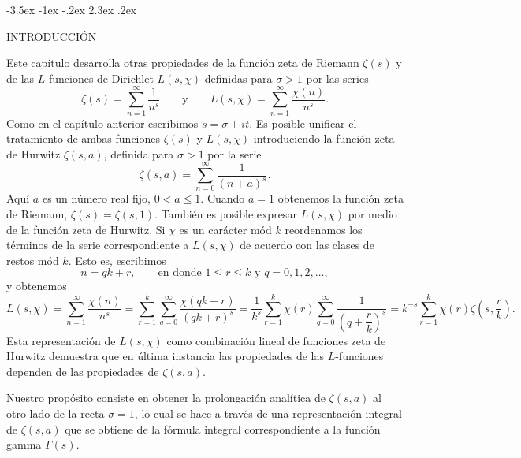 \documentclass[12pt,a4paper]{book}
\makeatletter
\renewcommand\section{\@startsection{section}{1}{\z@}%
  {-3.5ex \@plus -1ex \@minus -.2ex}%
  {2.3ex \@plus .2ex}%
  {\normalfont\Large\bfseries\raggedright}}
\makeatother
\begin{document}
    \section{INTRODUCCIÓN}

    Este capítulo desarrolla otras propiedades de la función zeta de Riemann $\zeta(s)$ y de\label{sim:zeta}\label{sim:zsa}
    las $L$-funciones de Dirichlet $L(s,\chi)$ definidas para $\sigma>1$ por las series
    \begin{equation*}
        \zeta(s)=\sum_{n=1}^{\infty}\frac{1}{n^{s}}\qquad\text{y}\qquad L(s,\chi)=\sum_{n=1}^{\infty}\frac{\chi(n)}{n^{s}}.
    \end{equation*}
    Como en el capítulo anterior escribimos $s=\sigma+it$. Es posible unificar el tratamiento
    de ambas funciones $\zeta(s)$ y $L(s,\chi)$ introduciendo la función zeta de Hurwitz
    $\zeta(s,a)$, definida para $\sigma>1$ por la serie
    \begin{equation*}
        \zeta(s,a)=\sum_{n=0}^{\infty}\frac{1}{(n+a)^{s}}.
    \end{equation*}
    Aquí $a$ es un número real fijo, $0<a\leq1$. Cuando $a=1$ obtenemos la función zeta de
    Riemann, $\zeta(s)=\zeta(s,1)$. También es posible expresar $L(s,\chi)$ por medio de la
    función zeta de Hurwitz. Si $\chi$ es un carácter mód $k$ reordenamos los términos de la
    serie correspondiente a $L(s,\chi)$ de acuerdo con las clases de restos mód $k$. Esto es,
    escribimos
    \begin{equation*}
        n=qk+r,\qquad\text{en donde }1\leq r\leq k\text{ y }q=0,1,2,\dots,
    \end{equation*}
    y obtenemos
    \begin{equation*}
        L(s,\chi)=\sum_{n=1}^{\infty}\frac{\chi(n)}{n^{s}}=\sum_{r=1}^{k}\sum_{q=0}^{\infty}\frac{\chi(qk+r)}{(qk+r)^{s}}
        =\frac{1}{k^{s}}\sum_{r=1}^{k}\chi(r)\sum_{q=0}^{\infty}\frac{1}{\left(q+\dfrac{r}{k}\right)^{s}}
        =k^{-s}\sum_{r=1}^{k}\chi(r)\zeta\left(s,\frac{r}{k}\right).
    \end{equation*}
    Esta representación de $L(s,\chi)$ como combinación lineal de funciones zeta de Hurwitz
    demuestra que en última instancia las propiedades de las $L$-funciones dependen de las
    propiedades de $\zeta(s,a)$.

    Nuestro propósito consiste en obtener la prolongación analítica de $\zeta(s,a)$ al otro
    lado de la recta $\sigma=1$, lo cual se hace a través de una representación integral de
    $\zeta(s,a)$ que se obtiene de la fórmula integral correspondiente a la función gamma
    $\Gamma(s)$.
\end{document}
